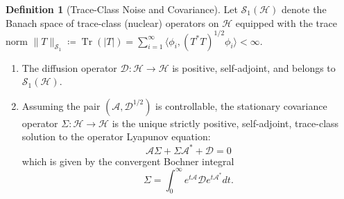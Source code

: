 \documentclass[11pt]{amsart}
\theoremstyle{plain}
\theoremstyle{definition}
\newtheorem{definition}[theorem]{Definition}
\theoremstyle{remark}
\newcommand{\tr}{\operatorname{Tr}}
\begin{document}
\begin{definition}[Trace-Class Noise and Covariance]
  \label{def:trace_class}
  Let $\mathcal{S}_1(\mathcal{H})$ denote the Banach space of trace-class (nuclear) operators on $\mathcal{H}$ equipped with the trace norm $\|T\|_{\mathcal{S}_1} \coloneqq \tr(|T|) = \sum_{i=1}^\infty \langle \phi_i, (T^*T)^{1/2} \phi_i \rangle < \infty$.
  \begin{enumerate}
    \item[(i)] The diffusion operator $\mathcal{D}: \mathcal{H} \to \mathcal{H}$ is positive, self-adjoint, and belongs to $\mathcal{S}_1(\mathcal{H})$.
    \item[(ii)] Assuming the pair $(\mathcal{A}, \mathcal{D}^{1/2})$ is controllable, the stationary covariance operator $\Sigma: \mathcal{H} \to \mathcal{H}$ is the unique strictly positive, self-adjoint, trace-class solution to the operator Lyapunov equation:
    \begin{equation}
      \label{eq:op_lyapunov}
      \mathcal{A}\Sigma + \Sigma\mathcal{A}^* + \mathcal{D} = 0
    \end{equation}
    which is given by the convergent Bochner integral
    \[
      \Sigma = \int_0^\infty e^{t\mathcal{A}} \mathcal{D} e^{t\mathcal{A}^*} dt.
    \]
  \end{enumerate}
\end{definition}
\end{document}
